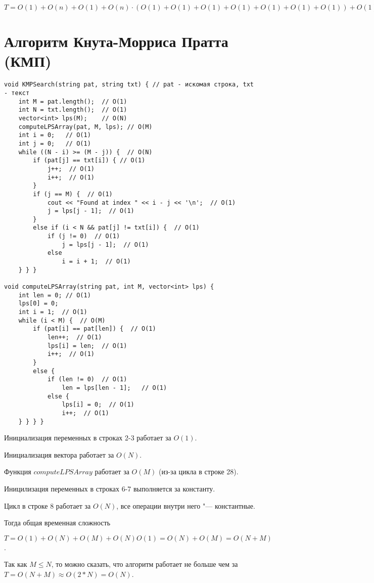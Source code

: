 \documentclass[otchet]{SCWorks}
\begin{document}
$T = O(1) + O(n) + O(1) + O(n) \cdot (O(1) + O(1) + O(1) + O(1) + O(1) + O(1) + O(1)) + O(1) + O(1) = O(1) + O(n) + O(n)O(1) + O(1) \approx O(n)$

\section{Алгоритм Кнута-Морриса Пратта (КМП)}

\begin{verbatim}
void KMPSearch(string pat, string txt) { // pat - искомая строка, txt - текст 
	int M = pat.length();  // О(1)
	int N = txt.length();  // О(1)
	vector<int> lps(M);    // О(N)
	computeLPSArray(pat, M, lps); // О(M)
	int i = 0;   // О(1)
	int j = 0;   // О(1)
	while ((N - i) >= (M - j)) {  // O(N)
		if (pat[j] == txt[i]) { // О(1)
			j++;  // О(1)
			i++;  // О(1)
		}
		if (j == M) {  // О(1)
			cout << "Found at index " << i - j << '\n';  // О(1)
			j = lps[j - 1];  // О(1)
		}
		else if (i < N && pat[j] != txt[i]) {  // О(1)
			if (j != 0)  // О(1)
				j = lps[j - 1];  // О(1)
			else
				i = i + 1;  // О(1)
	} } }

void computeLPSArray(string pat, int M, vector<int> lps) {
	int len = 0; // О(1)
	lps[0] = 0;
	int i = 1;  // О(1)
	while (i < M) {  // О(M)
		if (pat[i] == pat[len]) {  // О(1)
			len++;  // О(1)
			lps[i] = len;  // О(1)
			i++;  // О(1)
		}
		else {
			if (len != 0)  // О(1)
				len = lps[len - 1];   // О(1)
			else {
				lps[i] = 0;  // О(1)
				i++;  // О(1)
	} } } }
\end{verbatim}

Инициализация переменных в строках 2-3 работает за $O(1)$.

Инициализация вектора работает за $O(N)$.

Функция $computeLPSArray$ работает за $O(M)$ (из-за цикла в строке 28).

Иницилизация переменных в строках 6-7 выполняется за константу.

Цикл в строке 8 работает за $O(N)$, все операции внутри него "--- константные.

Тогда общая временная сложность 

$T = O(1) + O(N) + O(M) + O(N)O(1) = O(N) + O(M) = O(N+M)$.

Так как $M\le N$, то можно сказать, что алгоритм работает не больше чем за 
$T = O(N+M) \approx O(2 * N) = O(N)$.


	


\appendix
\end{document}
